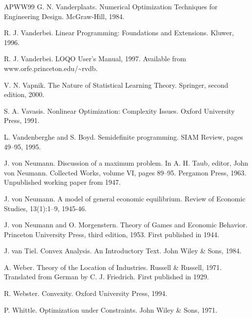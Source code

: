 \begin{thebibliography}{APWW99}
 G. N. Vanderplaats. Numerical Optimization Techniques for Engineering Design. McGraw-Hill, 1984.

 R. J. Vanderbei. Linear Programming: Foundations and Extensions. Kluwer, 1996.

 R. J. Vanderbei. LOQO User’s Manual, 1997. Available from www.orfe.princeton.edu/\textasciitilde{}rvdb.

 V. N. Vapnik. The Nature of Statistical Learning Theory. Springer, second edition, 2000.

 S. A. Vavasis. Nonlinear Optimization: Complexity Issues. Oxford University Press, 1991.

 L. Vandenberghe and S. Boyd. Semidefinite programming. SIAM Review, pages 49–95, 1995.

 J. von Neumann. Discussion of a maximum problem. In A. H. Taub, editor, John von Neumann. Collected Works, volume VI, pages 89–95. Pergamon Press, 1963. Unpublished working paper from 1947.

 J. von Neumann. A model of general economic equilibrium. Review of Economic Studies, 13(1):1–9, 1945-46.

 J. von Neumann and O. Morgenstern. Theory of Games and Economic Behavior. Princeton University Press, third edition, 1953. First published in 1944.

 J. van Tiel. Convex Analysis. An Introductory Text. John Wiley \& Sons, 1984.

 A. Weber. Theory of the Location of Industries. Russell \& Russell, 1971. Translated from German by C. J. Friedrich. First published in 1929.

 R. Webster. Convexity. Oxford University Press, 1994.

 P. Whittle. Optimization under Constraints. John Wiley \& Sons, 1971.


\end{thebibliography}
